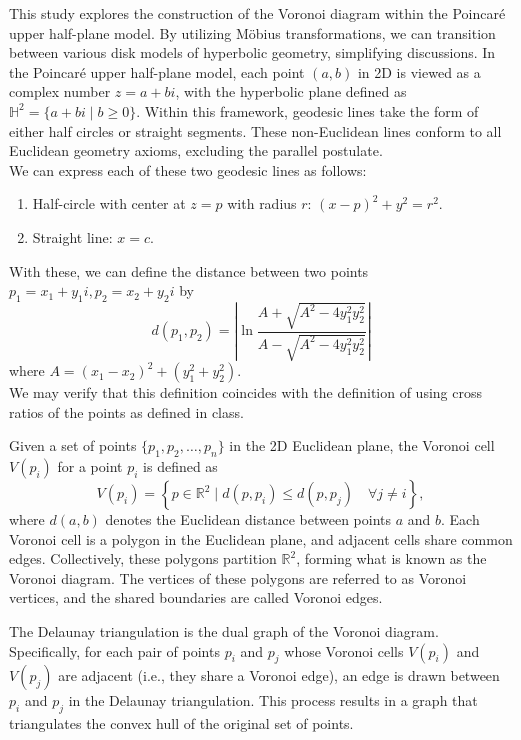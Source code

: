 \documentclass[minted, draw]{hebdomon}
\newcommand{\HH}{{\mathbb{H} }}
\begin{document}
This study explores the construction of the Voronoi diagram within the Poincaré upper half-plane model. By utilizing Möbius transformations, we can transition between various disk models of hyperbolic geometry, simplifying discussions. In the Poincaré upper half-plane model, each point $(a, b)$ in 2D is viewed as a complex number $z = a + bi$, with the hyperbolic plane defined as $\HH^2 = \{a+bi \mid b \ge 0\}$. Within this framework, geodesic lines take the form of either half circles or straight segments. These non-Euclidean lines conform to all Euclidean geometry axioms, excluding the parallel postulate. \\

We can express each of these two geodesic lines as follows:
\begin{enumerate}
    \item Half-circle with center at $z = p$ with radius $r$: $(x-p)^2 + y^2 = r^2$.
    \item Straight line: $x = c$. 
\end{enumerate}

With these, we can define the distance between two points $p_1 = x_1 + y_1i, p_2 = x_2 + y_2i$ by
\[
    d(p_1, p_2) = \left |  \ln \dfrac{A + \sqrt{A^2 - 4y_1^2y_2^2}}{A - \sqrt{A^2 - 4y_1^2y_2^2}} \right |
\]
where $A = (x_1-x_2)^2 + (y_1^2+y_2^2)$. \\

We may verify that this definition coincides with the definition of using cross ratios of the points as defined in class.


Given a set of points $\{p_1, p_2, \dots, p_n\}$ in the 2D Euclidean plane, the Voronoi cell $V(p_i)$ for a point $p_i$ is defined as
\[
V(p_i) = \left\{ p \in \mathbb{R}^2 \;\bigg|\; d(p, p_i) \leq d(p, p_j) \quad \forall j \neq i \right\},
\]
where $d(a, b)$ denotes the Euclidean distance between points $a$ and $b$. Each Voronoi cell is a polygon in the Euclidean plane, and adjacent cells share common edges. Collectively, these polygons partition $\mathbb{R}^2$, forming what is known as the Voronoi diagram. The vertices of these polygons are referred to as Voronoi vertices, and the shared boundaries are called Voronoi edges.


The Delaunay triangulation is the dual graph of the Voronoi diagram. Specifically, for each pair of points $p_i$ and $p_j$ whose Voronoi cells $V(p_i)$ and $V(p_j)$ are adjacent (i.e., they share a Voronoi edge), an edge is drawn between $p_i$ and $p_j$ in the Delaunay triangulation. This process results in a graph that triangulates the convex hull of the original set of points. 
\end{document}
